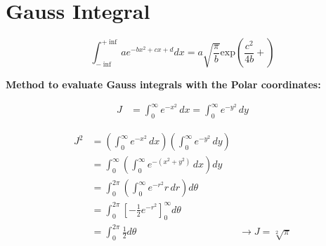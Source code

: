 \section{Gauss Integral}

\begin{equation}
    \int_{-\inf}^{+\inf}{a e^{-b x^2 + cx + d} dx} = a \sqrt{\frac{\pi}{b}} \text{exp}\left(\frac{c^2}{4b} + \right)
\end{equation}

\textbf{Method to evaluate Gauss integrals with the Polar coordinates:}

\begin{align*}
    J &= \int_0^\infty e^{-x^2} \, dx = \int_0^\infty e^{-y^2} \, dy
\end{align*}

\begin{align*}
    J^2 &= \left(\int_0^\infty e^{-x^2} \, dx\right) \left(\int_0^\infty e^{-y^2} \, dy\right) \\
        &= \int_0^\infty \left(\int_0^\infty e^{-(x^2 + y^2)} \, dx\right) dy \\
        &= \int_0^{2\pi} \left(\int_0^\infty e^{-r^2} r \, dr\right) d\theta \\
        &= \int_0^{2 \pi}{[-\frac{1}{2} e^{-r^2}]_0^\infty d\theta} \\
        &= \int_0^{2 \pi}{\frac{1}{2} d\theta}
        &\rightarrow J = \sqrt[2]{\pi}
\end{align*}

